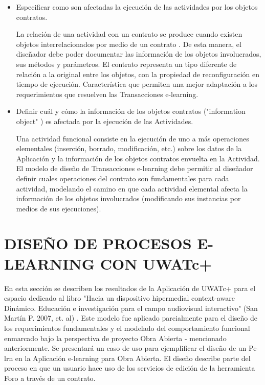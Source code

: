 \begin{itemize}

\item Especificar como son afectadas la ejecución de las actividades por los
objetos contratos. 


La relación de una actividad con un contrato se produce cuando existen objetos
interrelacionados por medio de un contrato \cite{fiadeiro}. De esta manera, el
diseñador debe poder documentar las información de los objetos involucrados, sus
métodos y parámetros. El contrato representa un tipo diferente de relación a la
original entre los objetos, con la propiedad de reconfiguración en tiempo de
ejecución. Característica que permiten una mejor adaptación a los requerimientos
que resuelven las Transacciones e-learning.

\item  Definir cuál y cómo la  información de los objetos contratos
("information object" \cite{informationobject}) es afectada por la ejecución de
las Actividades.


Una actividad funcional consiste en la ejecución de uno a más operaciones
elementales (inserción, borrado, modificación, etc.) sobre los datos de la
Aplicación y la información de los objetos contratos envuelta en la Actividad.
El modelo de diseño de Transacciones e-learning debe permitir al diseñador
definir cuales operaciones del contrato son fundamentales para cada actividad,
modelando el camino en que cada actividad elemental afecta la información de los
objetos involucrados (modificando sus instancias por medios de sus ejecuciones).
\end{itemize}


\section {DISEÑO DE PROCESOS E-LEARNING CON UWATc+} \label{diseno}

En esta sección se describen los resultados de la Aplicación de UWATc+ para el
espacio dedicado al libro "Hacia un dispositivo hipermedial context-aware
Dinámico. Educación e investigación para el campo audiovisual interactivo" (San
Martín P. 2007, et. al) \cite{libro}.  Este  modelo fue aplicado parcialmente
para el diseño de los requerimientos fundamentales y el modelado del
comportamiento funcional enmarcado bajo la perspectiva de proyecto Obra Abierta
- mencionado anteriormente. Se presentará un caso de uso para ejemplificar el
diseño de un Pe-lrn en la Aplicación e-learning para Obra Abierta. El diseño
describe parte del proceso en que un usuario hace uso de los servicios de
edición de la herramienta Foro a través de un contrato. 

